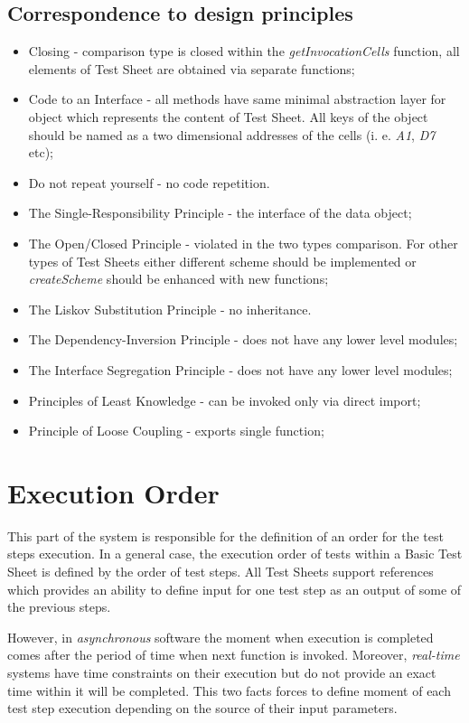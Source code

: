 \subsection{Correspondence to design principles}
\begin{itemize}
	\item Closing - comparison type is closed within the \textit{getInvocationCells} function, all elements of Test Sheet are obtained via separate functions;
	\item Code to an Interface - all methods have same minimal abstraction layer for object which represents the content of Test Sheet. All keys of the object should be named as a two dimensional addresses of the cells (i. e. \textit{A1}, \textit{D7} etc);
	\item Do not repeat yourself - no code repetition.
	\item The Single-Responsibility Principle - the interface of the data object;
	\item The Open/Closed Principle - violated in the two types comparison. For other types of Test Sheets either different scheme should be implemented or \textit{createScheme} should be enhanced with new functions;
	\item The Liskov Substitution Principle - no inheritance.
	\item The Dependency-Inversion Principle - does not have any lower level modules;
	\item The Interface Segregation Principle - does not have any lower level modules;
	\item Principles of Least Knowledge - can be invoked only via direct import;
	\item Principle of Loose Coupling - exports single function;
\end{itemize}

\section{Execution Order}
\label{sec:execOrder}
This part of the system is responsible for the definition of an order for the test steps execution. In a general case, the execution order of tests within a Basic Test Sheet is defined by the order of test steps. 
All Test Sheets support references which provides an ability to define input for one test step as an output of some of the previous steps.


However, in \textit{asynchronous} software the moment when execution is completed comes after the period of time when next function is invoked. Moreover, \textit{real-time} systems have time constraints on their execution but do not provide an exact time within it will be completed. This two facts forces to define moment of each test step execution depending on the source of their input parameters. 


